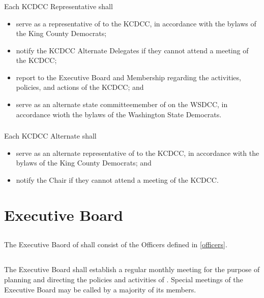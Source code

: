\subsubsection{}
Each KCDCC Representative shall
\begin{itemize}
    \item serve as a representative of \thedistrict{} to the KCDCC, in accordance with the bylaws of the King County Democrats;
    \item notify the KCDCC Alternate Delegates if they cannot attend a meeting of the KCDCC;
    \item report to the Executive Board and Membership regarding the activities, policies, and actions of the KCDCC; and
    \item serve as an alternate state committeemember of \thedistrict{} on the WSDCC, in accordance wioth the bylaws of the Washington State Democrats.
\end{itemize}

\subsubsection{}
Each KCDCC Alternate shall
\begin{itemize}
    \item serve as an alternate representative of \thedistrict{} to the KCDCC, in accordance with the bylaws of the King County Democrats; and
    \item notify the Chair if they cannot attend a meeting of the KCDCC.
\end{itemize}


\section{Executive Board}
\label{exec-board}
\subsection{}
The Executive Baord of \thedistrict{} shall consist of the Officers defined in \autoref{officers}.

\subsection{}
The Executive Board shall establish a regular monthly meeting for the purpose of planning and directing the policies and activities of \thedistrict{}. Special meetings of the Executive Board may be called by a majority of its members.

